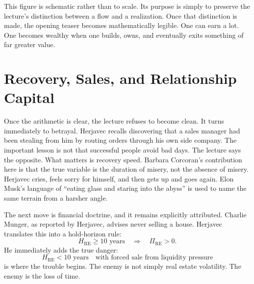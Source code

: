 \begin{figure}
\centering
{}
\end{figure}

This figure is schematic rather than to scale. Its purpose is simply to preserve the lecture's distinction between a flow and a realization. Once that distinction is made, the opening teaser becomes mathematically legible. One can earn a lot. One becomes wealthy when one builds, owns, and eventually exits something of far greater value.

\section{Recovery, Sales, and Relationship Capital}

Once the arithmetic is clear, the lecture refuses to become clean. It turns immediately to betrayal. Herjavec recalls discovering that a sales manager had been stealing from him by routing orders through his own side company. The important lesson is not that successful people avoid bad days. The lecture says the opposite. What matters is recovery speed. Barbara Corcoran's contribution here is that the true variable is the duration of misery, not the absence of misery. Herjavec cries, feels sorry for himself, and then gets up and goes again. Elon Musk's language of ``eating glass and staring into the abyss'' is used to name the same terrain from a harsher angle.

The next move is financial doctrine, and it remains explicitly attributed. Charlie Munger, as reported by Herjavec, advises never selling a house. Herjavec translates this into a hold-horizon rule:
\begin{equation}
H_{\mathrm{RE}} \ge 10 \text{ years}
\quad \Rightarrow \quad
\Pi_{\mathrm{RE}} > 0.
\end{equation}
He immediately adds the true danger:
\begin{equation}
H_{\mathrm{RE}} < 10 \text{ years}
\quad \text{with forced sale from liquidity pressure}
\end{equation}
is where the trouble begins. The enemy is not simply real estate volatility. The enemy is the loss of time.

